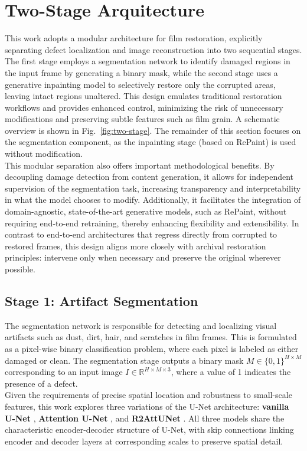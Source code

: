 \documentclass[10pt,a4paper,twocolumn,twoside]{article}
\begin{document}
\section{Two-Stage Arquitecture}
This work adopts a modular architecture for film restoration, explicitly separating defect localization and image reconstruction into two sequential stages. The first stage employs a segmentation network to identify damaged regions in the input frame by generating a binary mask, while the second stage uses a generative inpainting model to selectively restore only the corrupted areas, leaving intact regions unaltered. This design emulates traditional restoration workflows and provides enhanced control, minimizing the risk of unnecessary modifications and preserving subtle features such as film grain. A schematic overview is shown in Fig.~\ref{fig:two-stage}. The remainder of this section focuses on the segmentation component, as the inpainting stage (based on RePaint) is used without modification. \\
This modular separation also offers important methodological benefits. By decoupling damage detection from content generation, it allows for independent supervision of the segmentation task, increasing transparency and interpretability in what the model chooses to modify. Additionally, it facilitates the integration of domain-agnostic, state-of-the-art generative models, such as RePaint, without requiring end-to-end retraining, thereby enhancing flexibility and extensibility. In contrast to end-to-end architectures that regress directly from corrupted to restored frames, this design aligns more closely with archival restoration principles: intervene only when necessary and preserve the original wherever possible.
\subsection{Stage 1: Artifact Segmentation}
The segmentation network is responsible for detecting and localizing visual artifacts such as dust, dirt, hair, and scratches in film frames. This is formulated as a pixel-wise binary classification problem, where each pixel is labeled as either damaged or clean. The segmentation stage outputs a binary mask $M \in \{0,1\}^{H\times M}$ corresponding to an input image $I \in \mathbb{R}^{H\times M \times 3}$, where a value of 1 indicates the presence of a defect.\\ Given the requirements of precise spatial location and robustness to small-scale features, this work explores three variations of the U-Net architecture: \textbf{vanilla U-Net} \cite{unet}, \textbf{Attention U-Net} \cite{attunet}, and \textbf{R2AttUNet} \cite{r2attunet}. All three models share the characteristic encoder-decoder structure of U-Net, with skip connections linking encoder and decoder layers at corresponding scales to preserve spatial detail.
\end{document}
